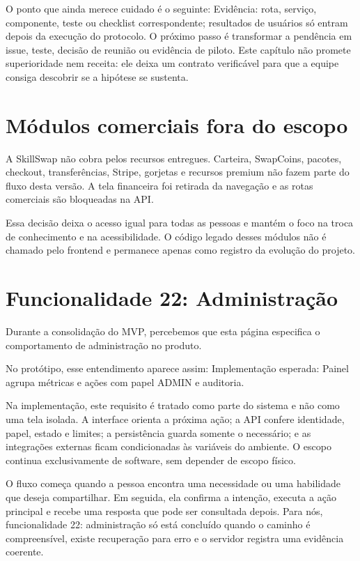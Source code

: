 \documentclass[12pt,oneside,a4paper,article]{abntex2}
\begin{document}
O ponto que ainda merece cuidado é o seguinte: Evidência: rota, serviço, componente, teste ou checklist correspondente; resultados de usuários só entram depois da execução do protocolo. O próximo passo é transformar a pendência em issue, teste, decisão de reunião ou evidência de piloto. Este capítulo não promete superioridade nem receita: ele deixa um contrato verificável para que a equipe consiga descobrir se a hipótese se sustenta.

\section{Módulos comerciais fora do escopo}

A SkillSwap não cobra pelos recursos entregues. Carteira, SwapCoins, pacotes, checkout, transferências, Stripe, gorjetas e recursos premium não fazem parte do fluxo desta versão. A tela financeira foi retirada da navegação e as rotas comerciais são bloqueadas na API.

Essa decisão deixa o acesso igual para todas as pessoas e mantém o foco na troca de conhecimento e na acessibilidade. O código legado desses módulos não é chamado pelo frontend e permanece apenas como registro da evolução do projeto.
\section{Funcionalidade 22: Administração}
Durante a consolidação do MVP, percebemos que esta página especifica o comportamento de administração no produto.

No protótipo, esse entendimento aparece assim: Implementação esperada: Painel agrupa métricas e ações com papel ADMIN e auditoria.

Na implementação, este requisito é tratado como parte do sistema e não como uma tela isolada. A interface orienta a próxima ação; a API confere identidade, papel, estado e limites; a persistência guarda somente o necessário; e as integrações externas ficam condicionadas às variáveis do ambiente. O escopo continua exclusivamente de software, sem depender de escopo físico.

O fluxo começa quando a pessoa encontra uma necessidade ou uma habilidade que deseja compartilhar. Em seguida, ela confirma a intenção, executa a ação principal e recebe uma resposta que pode ser consultada depois. Para nós, funcionalidade 22: administração só está concluído quando o caminho é compreensível, existe recuperação para erro e o servidor registra uma evidência coerente.
\end{document}
